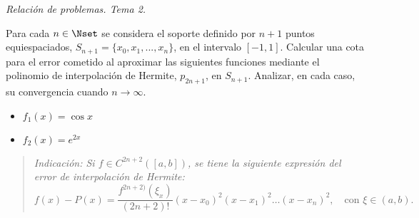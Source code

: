\documentclass[11pt]{article}
\begin{document}
\begin{flushright}
  \LARGE\it Relación de problemas. Tema \huge 2.\\
  \bigskip
\end{flushright}

\begin{problemas}

   \begin{problema}
     Para cada $n\in\Nset$ se considera el soporte definido por $n+1$
     puntos equiespaciados, $S_{n+1}=\{x_0,x_1,...,x_n\}$, en el intervalo
     $[-1,1]$.  Calcular una cota para el error cometido al aproximar
     las siguientes funciones mediante el polinomio de interpolación
     de Hermite, $p_{2n+1}$, en $S_{n+1}$. Analizar, en cada caso, su
     convergencia cuando $n\to\infty$.
     \begin{itemize}
     \item $\displaystyle f_1(x)=\cos x$
     \item $\displaystyle f_2(x)=e^{2x}$
     \end{itemize}
     \begin{quote}\em\small
       Indicación: Si $f\in C^{2n+2}([a,b])$, se tiene la siguiente
       expresión del error de interpolación de Hermite: 
       \begin{equation*}
         f(x)-P(x)=\frac{f^{2n+2)}(\xi_x)}{(2n+2)!}
         (x-x_0)^2(x-x_1)^2\dots(x-x_n)^2, \quad\text{con } \xi\in (a,b).
       \end{equation*}
     \end{quote}
   \end{problema}
  
  \end{problemas}
\end{document}
